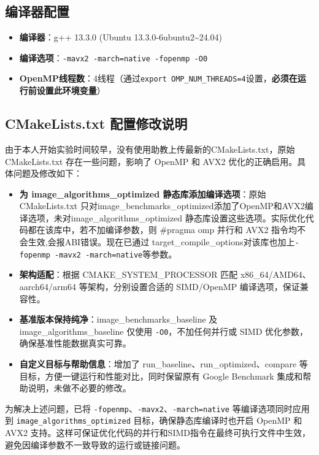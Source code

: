 \documentclass[a4paper]{article}
\begin{document}
\subsection{编译器配置}
\begin{itemize}
    \item \textbf{编译器}：g++ 13.3.0 (Ubuntu 13.3.0-6ubuntu2\textasciitilde24.04)
    \item \textbf{编译选项}：\texttt{-mavx2 -march=native -fopenmp -O0}
    \item \textbf{OpenMP线程数}：4线程（通过\texttt{export OMP\_NUM\_THREADS=4}设置，\textbf{必须在运行前设置此环境变量}）
\end{itemize}
\subsection{CMakeLists.txt 配置修改说明}
由于本人开始实验时间较早，没有使用助教上传最新的CMakeLists.txt，原始 CMakeLists.txt 存在一些问题，影响了 OpenMP 和 AVX2 优化的正确启用。具体问题及修改如下：
\begin{tcolorbox}[colback=yellow!10!white, colframe=NavyBlue, title=CMakeLists.txt 配置修改, sharp corners, boxrule=0.8pt]
\begin{itemize}
    \item \textbf{为 image\_algorithms\_optimized 静态库添加编译选项}：原始 CMakeLists.txt 只对image\_benchmarks\_optimized添加了OpenMP和AVX2编译选项，未对image\_algorithms\_optimized 静态库设置这些选项。实际优化代码都在该库中，若不加编译参数，则 \#pragma omp 并行和 AVX2 指令均不会生效,会报ABI错误。现在已通过 target\_compile\_options对该库也加上\texttt{-fopenmp -mavx2 -march=native}等参数。
    \item \textbf{架构适配}：根据 CMAKE\_SYSTEM\_PROCESSOR 匹配 x86\_64/AMD64、aarch64/arm64 等架构，分别设置合适的 SIMD/OpenMP 编译选项，保证兼容性。
    \item \textbf{基准版本保持纯净}：image\_benchmarks\_baseline 及 image\_algorithms\_baseline 仅使用 \texttt{-O0}，不加任何并行或 SIMD 优化参数，确保基准性能数据真实可靠。
    \item \textbf{自定义目标与帮助信息}：增加了 run\_baseline、run\_optimized、compare 等目标，方便一键运行和性能对比，同时保留原有 Google Benchmark 集成和帮助说明，未做不必要的修改。
\end{itemize}
\end{tcolorbox}
为解决上述问题，已将 \texttt{-fopenmp}、\texttt{-mavx2}、\texttt{-march=native} 等编译选项同时应用到 \texttt{image\_algorithms\_optimized} 目标，确保静态库编译时也开启 OpenMP 和 AVX2 支持。这样可保证优化代码的并行和SIMD指令在最终可执行文件中生效，避免因编译参数不一致导致的运行或链接问题。
\end{document}
